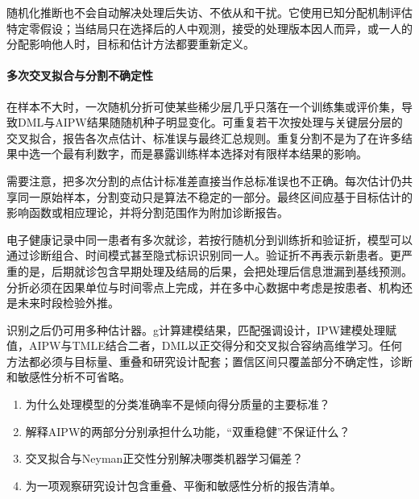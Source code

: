 随机化推断也不会自动解决处理后失访、不依从和干扰。它使用已知分配机制评估特定零假设；当结局只在选择后的人中观测，接受的处理版本因人而异，或一人的分配影响他人时，目标和估计方法都要重新定义。

\paragraph{多次交叉拟合与分割不确定性}

在样本不大时，一次随机分折可使某些稀少层几乎只落在一个训练集或评价集，导致DML与AIPW结果随随机种子明显变化。可重复若干次按处理与关键层分层的交叉拟合，报告各次点估计、标准误与最终汇总规则。重复分割不是为了在许多结果中选一个最有利数字，而是暴露训练样本选择对有限样本结果的影响。

需要注意，把多次分割的点估计标准差直接当作总标准误也不正确。每次估计仍共享同一原始样本，分割变动只是算法不稳定的一部分。最终区间应基于目标估计的影响函数或相应理论，并将分割范围作为附加诊断报告。

\begin{failurecheck}[随机拆行制造了虚假外样本]
电子健康记录中同一患者有多次就诊，若按行随机分到训练折和验证折，模型可以通过诊断组合、时间模式甚至隐式标识识别同一人。验证折不再表示新患者。更严重的是，后期就诊包含早期处理及结局的后果，会把处理后信息泄漏到基线预测。分折必须在因果单位与时间零点上完成，并在多中心数据中考虑是按患者、机构还是未来时段检验外推。
\end{failurecheck}

\begin{chapterreview}
识别之后仍可用多种估计器。g计算建模结果，匹配强调设计，IPW建模处理赋值，AIPW与TMLE结合二者，DML以正交得分和交叉拟合容纳高维学习。任何方法都必须与目标量、重叠和研究设计配套；置信区间只覆盖部分不确定性，诊断和敏感性分析不可省略。
\end{chapterreview}

\begin{selfcheck}
\begin{enumerate}
  \item 为什么处理模型的分类准确率不是倾向得分质量的主要标准？
  \item 解释AIPW的两部分分别承担什么功能，“双重稳健”不保证什么？
  \item 交叉拟合与Neyman正交性分别解决哪类机器学习偏差？
  \item 为一项观察研究设计包含重叠、平衡和敏感性分析的报告清单。
\end{enumerate}
\end{selfcheck}

